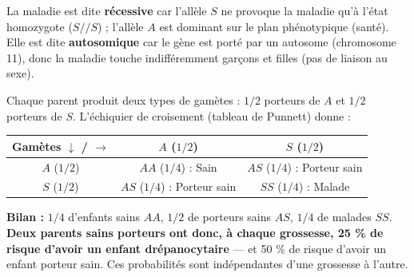 \documentclass[11pt]{article}
\begin{document}
La maladie est dite \textbf{récessive} car l'allèle $S$ ne provoque la maladie qu'à l'état homozygote ($S//S$) ; l'allèle $A$ est dominant sur le plan phénotypique (santé). Elle est dite \textbf{autosomique} car le gène est porté par un autosome (chromosome 11), donc la maladie touche indifféremment garçons et filles (pas de liaison au sexe).

\begin{exemplebox}
Chaque parent produit deux types de gamètes : $1/2$ porteurs de $A$ et $1/2$ porteurs de $S$. L'échiquier de croisement (tableau de Punnett) donne :

\begin{center}
\begin{tabular}{|c|c|c|}\hline
\rowcolor{popblueL} \textbf{Gamètes $\downarrow$ / $\rightarrow$} & $A$ ($1/2$) & $S$ ($1/2$) \\ \hline
$A$ ($1/2$) & $AA$ ($1/4$) : Sain & $AS$ ($1/4$) : Porteur sain \\ \hline
$S$ ($1/2$) & $AS$ ($1/4$) : Porteur sain & $SS$ ($1/4$) : Malade \\ \hline
\end{tabular}
\end{center}

\textbf{Bilan :} $1/4$ d'enfants sains $AA$, $1/2$ de porteurs sains $AS$, $1/4$ de malades $SS$. \textbf{Deux parents sains porteurs ont donc, à chaque grossesse, 25 \% de risque d'avoir un enfant drépanocytaire} — et 50 \% de risque d'avoir un enfant porteur sain. Ces probabilités sont indépendantes d'une grossesse à l'autre.
\end{exemplebox}
\end{document}
